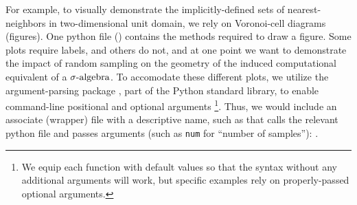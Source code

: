 For example, to visually demonstrate the implicitly-defined sets of nearest-neighbors in two-dimensional unit domain, we rely on Voronoi-cell diagrams (figures).
One python file () contains the methods required to draw a figure.
Some plots require labels, and others do not, and at one point we want to demonstrate the impact of random sampling on the geometry of the induced computational equivalent of a $\sigma\text{-algebra}$.
To accomodate these different plots, we utilize the argument-parsing package , part of the Python standard library, to enable command-line positional and optional arguments \footnote{We equip each function with default values so that the syntax  without any additional arguments will work, but specific examples rely on properly-passed optional arguments.}.
Thus, we would include an associate (wrapper) file with a descriptive name, such as  that calls the relevant python file and passes arguments (such as {\tt num} for ``number of samples''):
.
